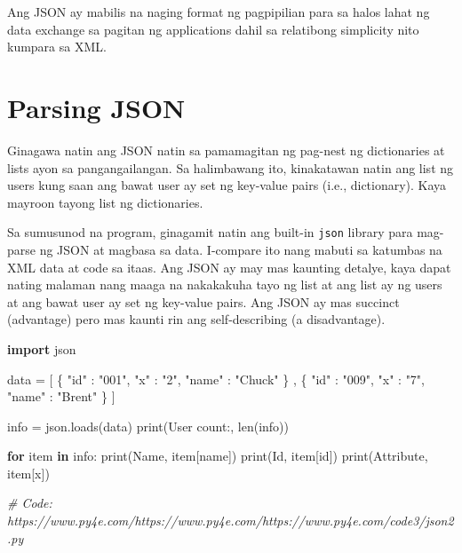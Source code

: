 \documentclass[10pt,]{book}
\newenvironment{Shaded}{}{}
\newcommand{\BuiltInTok}[1]{\textcolor[rgb]{0.00,0.50,0.00}{#1}}
\newcommand{\CommentTok}[1]{\textcolor[rgb]{0.38,0.63,0.69}{\textit{#1}}}
\newcommand{\ControlFlowTok}[1]{\textcolor[rgb]{0.00,0.44,0.13}{\textbf{#1}}}
\newcommand{\ImportTok}[1]{\textcolor[rgb]{0.00,0.50,0.00}{\textbf{#1}}}
\newcommand{\KeywordTok}[1]{\textcolor[rgb]{0.00,0.44,0.13}{\textbf{#1}}}
\newcommand{\NormalTok}[1]{#1}
\newcommand{\OperatorTok}[1]{\textcolor[rgb]{0.40,0.40,0.40}{#1}}
\newcommand{\StringTok}[1]{\textcolor[rgb]{0.25,0.44,0.63}{#1}}
\begin{document}
Ang JSON ay mabilis na naging format ng pagpipilian para sa halos lahat
ng data exchange sa pagitan ng applications dahil sa relatibong
simplicity nito kumpara sa XML.

\section{Parsing JSON}\label{parsing-json}

Ginagawa natin ang JSON natin sa pamamagitan ng pag-nest ng dictionaries
at lists ayon sa pangangailangan. Sa halimbawang ito, kinakatawan natin
ang list ng users kung saan ang bawat user ay set ng key-value pairs
(i.e., dictionary). Kaya mayroon tayong list ng dictionaries.

Sa sumusunod na program, ginagamit natin ang built-in \texttt{json}
library para mag-parse ng JSON at magbasa sa data. I-compare ito nang
mabuti sa katumbas na XML data at code sa itaas. Ang JSON ay may mas
kaunting detalye, kaya dapat nating malaman nang maaga na nakakakuha
tayo ng list at ang list ay ng users at ang bawat user ay set ng
key-value pairs. Ang JSON ay mas succinct (advantage) pero mas kaunti
rin ang self-describing (a disadvantage).

\begin{Shaded}
\begin{Highlighting}[]
\ImportTok{import}\NormalTok{ json}

\NormalTok{data }\OperatorTok{=} \StringTok{\textquotesingle{}\textquotesingle{}\textquotesingle{}}
\StringTok{[}
\StringTok{  \{ "id" : "001",}
\StringTok{    "x" : "2",}
\StringTok{    "name" : "Chuck"}
\StringTok{  \} ,}
\StringTok{  \{ "id" : "009",}
\StringTok{    "x" : "7",}
\StringTok{    "name" : "Brent"}
\StringTok{  \}}
\StringTok{]\textquotesingle{}\textquotesingle{}\textquotesingle{}}

\NormalTok{info }\OperatorTok{=}\NormalTok{ json.loads(data)}
\BuiltInTok{print}\NormalTok{(}\StringTok{\textquotesingle{}User count:\textquotesingle{}}\NormalTok{, }\BuiltInTok{len}\NormalTok{(info))}

\ControlFlowTok{for}\NormalTok{ item }\KeywordTok{in}\NormalTok{ info:}
    \BuiltInTok{print}\NormalTok{(}\StringTok{\textquotesingle{}Name\textquotesingle{}}\NormalTok{, item[}\StringTok{\textquotesingle{}name\textquotesingle{}}\NormalTok{])}
    \BuiltInTok{print}\NormalTok{(}\StringTok{\textquotesingle{}Id\textquotesingle{}}\NormalTok{, item[}\StringTok{\textquotesingle{}id\textquotesingle{}}\NormalTok{])}
    \BuiltInTok{print}\NormalTok{(}\StringTok{\textquotesingle{}Attribute\textquotesingle{}}\NormalTok{, item[}\StringTok{\textquotesingle{}x\textquotesingle{}}\NormalTok{])}

\CommentTok{\# Code: https://www.py4e.com/https://www.py4e.com/https://www.py4e.com/code3/json2.py}
\end{Highlighting}
\end{Shaded}
\end{document}
